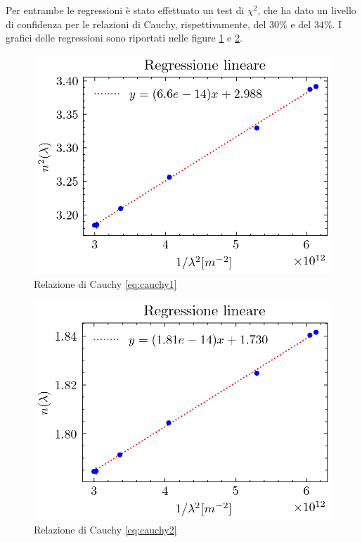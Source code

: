 \documentclass{article}
\begin{document}
        Per entrambe le regressioni è stato effettuato un test di $\chi^2$, che ha dato un livello di confidenza per le relazioni di Cauchy, rispettivamente, 
        del $30\%$ e del $34\%$. I grafici delle regressioni sono riportati nelle figure \ref{figure:Cauchy_1} e \ref{figure:Cauchy_2}. 

        \begin{figure} [H]

            \centering
            \includegraphics{../images/Cauchy_1.png}
            \caption{Relazione di Cauchy \ref{eq:cauchy1}}
            \label{figure:Cauchy_1}

        \end{figure}

        \begin{figure} [H]

            \centering
            \includegraphics{../images/Cauchy_2.png}
            \caption{Relazione di Cauchy \ref{eq:cauchy2}}
            \label{figure:Cauchy_2}

        \end{figure}
        
\end{document}
